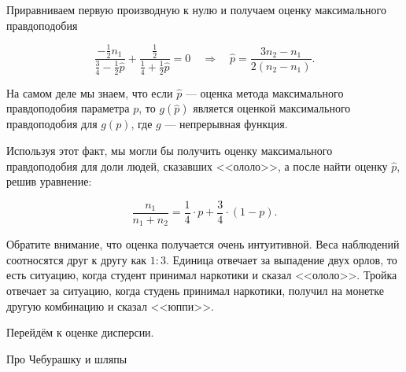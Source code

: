\begin{sol}
	Приравниваем первую производную к нулю и получаем оценку максимального правдоподобия
	
	\begin{equation*} 
\frac{ - \frac{1}{2} n_1}{\frac{3}{4} - \frac{1}{2} \hat p} + \frac{\frac{1}{2}}{\frac{1}{4} + \frac{1}{2} \hat p} = 0 \quad \Rightarrow \quad \hat p = \frac{3 n_2 - n_1}{2(n_2 - n_1)}.
	\end{equation*}
	
На самом деле мы знаем, что если $\hat p$ --- оценка метода максимального правдоподобия параметра $p$, то $g(\hat p)$ является оценкой максимального правдоподобия для $g(p)$,  где   $g$ --- непрерывная функция. 

Используя этот факт, мы могли бы получить оценку максимального правдоподобия для доли людей, сказавших <<ололо>>, а после найти оценку $\hat p$, решив уравнение: 

\[ 
\frac{n_1}{n_1 + n_2} = \frac{1}{4} \cdot p + \frac{3}{4} \cdot (1-p).
\]

Обратите внимание, что оценка получается очень интуитивной. Веса наблюдений соотносятся друг к другу как $1 : 3$.  Единица отвечает за выпадение двух орлов, то есть ситуацию, когда студент принимал наркотики и сказал <<ололо>>. Тройка отвечает за ситуацию, когда студень принимал наркотики, получил на монетке другую комбинацию и сказал <<юппи>>. 

Перейдём к оценке дисперсии. 	
	
\end{sol} 


\begin{problem} 
	Про Чебурашку и шляпы 


	\begin{sol}

	\end{sol}
\end{problem}

